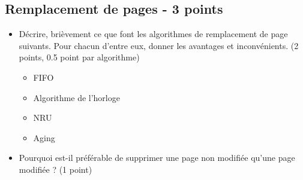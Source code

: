 \subsection{Remplacement de pages - 3 points}
\begin{itemize}
   \item Décrire, brièvement ce que font les algorithmes de remplacement de page suivants. Pour chacun d'entre eux, donner les avantages et inconvénients. (2 points, 0.5 point par algorithme)
         \begin{itemize}
            \item FIFO
            \item Algorithme de l'horloge
            \item NRU
            \item Aging
         \end{itemize}
   \item Pourquoi est-il préférable de supprimer une page non modifiée qu'une page modifiée ? (1 point)
\end{itemize}

